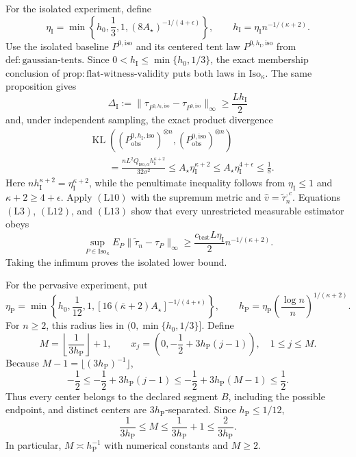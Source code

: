 For the isolated experiment, define
\[
 \eta_{\mathrm I}
 =\min\left\{h_0,\frac13,1,
 (8A_\star)^{-1/(4+\epsilon)}\right\},
 \qquad
 h_{\mathrm I}=\eta_{\mathrm I}n^{-1/(\kappa+2)}.
 \tag{L11}
\]
Use the isolated baseline \(P^{0,\mathrm{iso}}\) and its centered tent law \(P^{0,h_{\mathrm I},\mathrm{iso}}\) from
\(\mathrm{def{:}gaussian\text{-}tents}\).  Since
\(0<h_{\mathrm I}\leq\min\{h_0,1/3\}\), the exact membership conclusion of
\(\mathrm{prop{:}flat\text{-}witness\text{-}validity}\) puts both laws in
\(\mathrm{Iso}_\kappa\).  The same proposition gives
\[
 \Delta_{\mathrm I}:=
 \|\tau_{P^{0,h_{\mathrm I},\mathrm{iso}}}
       -\tau_{P^{0,\mathrm{iso}}}\|_\infty
 \geq\frac{Lh_{\mathrm I}}2
 \tag{L12}
\]
and, under independent sampling, the exact product divergence
\[
\begin{aligned}
 &\operatorname{KL}\!\left(
 (P^{0,h_{\mathrm I},\mathrm{iso}}_{\mathrm{obs}})^{\otimes n},
 (P^{0,\mathrm{iso}}_{\mathrm{obs}})^{\otimes n}\right)\\
 &\qquad=
 \frac{nL^2Q_{\mathrm{iso},\alpha}h_{\mathrm I}^{\kappa+2}}
      {32\sigma^2}
 \leq A_\star\eta_{\mathrm I}^{\kappa+2}
 \leq A_\star\eta_{\mathrm I}^{4+\epsilon}
 \leq\frac18.
\end{aligned}
 \tag{L13}
\]
Here \(n h_{\mathrm I}^{\kappa+2}=\eta_{\mathrm I}^{\kappa+2}\), while the penultimate inequality follows from \(\eta_{\mathrm I}\leq1\) and \(\kappa+2\geq4+\epsilon\).  Apply \((\mathrm{L10})\) with the supremum metric and \(\widehat v=\widetilde\tau_n^{,c}\).  Equations \((\mathrm{L3})\), \((\mathrm{L12})\), and \((\mathrm{L13})\) show that every unrestricted measurable estimator obeys
\[
 \sup_{P\in\mathrm{Iso}_\kappa}
 E_P\|\widetilde\tau_n-\tau_P\|_\infty
 \geq\frac{c_{\mathrm{test}}L\eta_{\mathrm I}}2
 n^{-1/(\kappa+2)}.
 \tag{L14}
\]
Taking the infimum proves the isolated lower bound.

For the pervasive experiment, put
\[
 \eta_{\mathrm P}
 =\min\left\{h_0,\frac1{12},1,
 [16(\bar\kappa+2)A_\star]^{-1/(4+\epsilon)}\right\},
 \qquad
 h_{\mathrm P}=\eta_{\mathrm P}
 \left(\frac{\log n}{n}\right)^{1/(\kappa+2)}.
 \tag{L15}
\]
For \(n\geq2\), this radius lies in \((0,\min\{h_0,1/3\}]\).  Define
\[
 M=\left\lfloor\frac1{3h_{\mathrm P}}\right\rfloor+1,
 \qquad
 x_j=\left(0,-\frac12+3h_{\mathrm P}(j-1)\right),
 \quad 1\leq j\leq M.
 \tag{L16}
\]
Because \(M-1=\lfloor(3h_{\mathrm P})^{-1}\rfloor\),
\[
 -\frac12\leq-\frac12+3h_{\mathrm P}(j-1)
 \leq-\frac12+3h_{\mathrm P}(M-1)\leq\frac12.
 \tag{L17}
\]
Thus every center belongs to the declared segment \(B\), including the possible endpoint, and distinct centers are \(3h_{\mathrm P}\)-separated.  Since \(h_{\mathrm P}\leq1/12\),
\[
 \frac1{3h_{\mathrm P}}
 \leq M
 \leq\frac1{3h_{\mathrm P}}+1
 \leq\frac2{3h_{\mathrm P}}.
 \tag{L18}
\]
In particular, \(M\asymp h_{\mathrm P}^{-1}\) with numerical constants and \(M\geq2\).

